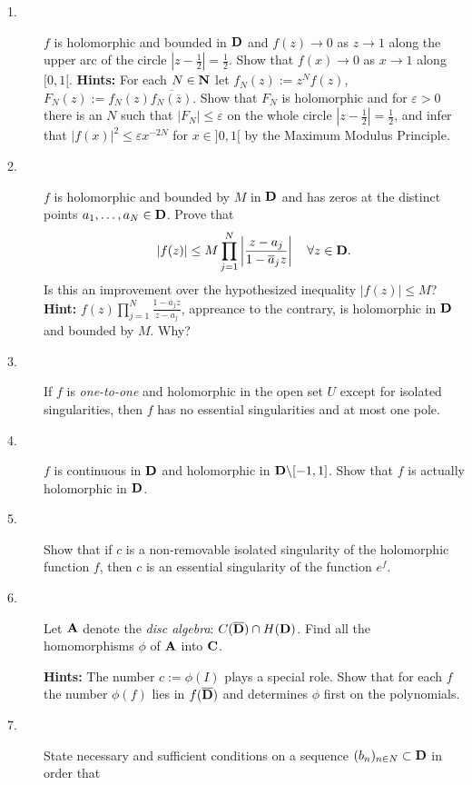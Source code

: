 \documentclass{article}
\begin{document}
\begin{description}
\item[1.]
$f$ is holomorphic and bounded in ${\bf D}$ and $f(z) \to 0$ as
$z \to 1$ along the upper arc of the circle $|z - \frac{1}{2}| = \frac{1}{2}$.
Show that $f(x) \to 0$ as $x \to 1$ along $[0,1[$.
{\bf Hints:} For each $N \in {\bf N}$ let $f_N (z) := z^N f(z)$,
$F_N(z) := f_N (z) \overline{f_N (\overline{z})}$. Show that $F_N$
is holomorphic and for $\varepsilon >0$ there is an $N$ such that
$|F_N| \leq \varepsilon$ on the whole circle
$|z - \frac{1}{2}| = \frac{1}{2}$, and infer that
$|f(x)|^2 \leq \varepsilon x^{-2 N}$ for $x \in ]0,1[$ by the Maximum
Modulus Principle.

\item[2.]
$f$ is holomorphic and bounded by $M$ in ${\bf D}$ and has zeros at the distinct
points $a_1, \dots, a_N \in {\bf D}$. Prove that
$$|f(z)| \leq M \prod^N_{j=1} \left|\frac{z-a_j}{1- \overline a_j z} \right|
  \quad \forall z \in {\bf D}.$$
Is this an improvement over the hypothesized inequality $|f(z)| \leq M$?
{\bf Hint:} $f(z) \prod^N_{j=1} \frac{1-\overline a_j z}{z-a_j}$, appreance
to the contrary, is holomorphic in ${\bf D}$ and bounded by $M$. Why?

\item[3.]
If $f$ is {\it one-to-one} and holomorphic in the open set $U$ except for
isolated singularities, then $f$ has no essential singularities and at most
one pole.

\item[4.]
$f$ is continuous in ${\bf D}$ and holomorphic in ${\bf D} \backslash [-1,1]$. Show
that $f$ is actually holomorphic in ${\bf D}$.

\item[5.]
Show that if $c$ is a non-removable isolated singularity of the holomorphic
function $f$, then $c$ is an essential singularity of the function $e^f$.

\item[6.]
Let ${\bf A}$ denote the {\it disc algebra}: $C(\overline {\bf D}) \cap H ({\bf D})$.
Find all the homomorphisms $\phi$ of ${\bf A}$ into ${\bf C}$.

{\bf Hints:} The number $c := \phi (I)$ plays a special role. Show that for
each $f$ the number $\phi (f)$ lies in $f(\overline {\bf D})$ and determines
$\phi$ first on the polynomials.

\item[7.]
State necessary and sufficient conditions on a sequence
$(b_n)_{n \in N} \subset {\bf D}$ in order that


\end{description}
\end{document}
